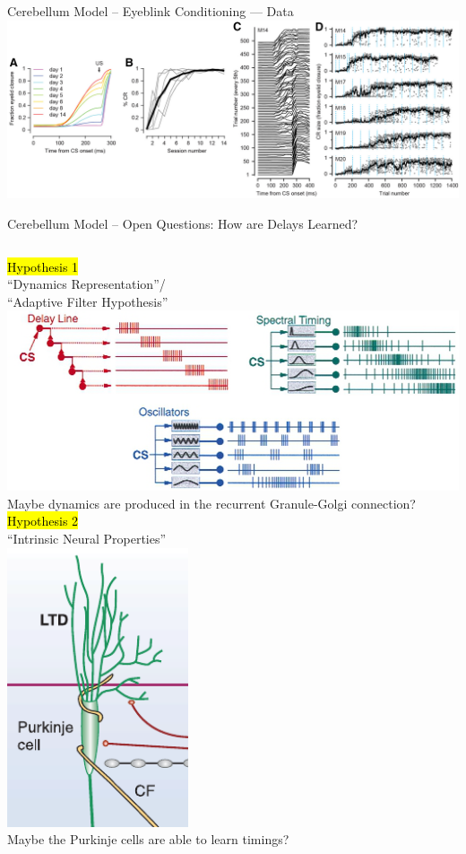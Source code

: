 \documentclass[handout,aspectratio=169]{beamer}
\begin{document}
	\begin{frame}{Cerebellum Model -- Eyeblink Conditioning --- Data}
		\centering\includegraphics[width=\textwidth]{media/heiney_et_al_avg_cr_over_time_2.png}
	\end{frame}
	
	\begin{frame}{Cerebellum Model -- Open Questions: How are Delays Learned?}
		\begin{columns}[t]
			\centering
			\hl{Hypothesis 1}\\[0.25cm]
			\enquote{Dynamics Representation}/\\\enquote{Adaptive Filter Hypothesis}\\[0.775cm]
			\includegraphics[width=\textwidth]{media/dynamics_rep.png}\\[0.775cm]
			Maybe dynamics are produced in the recurrent Granule-Golgi connection?
			\centering
			\hl{Hypothesis 2}\\[0.25cm]
			\enquote{Intrinsic Neural Properties}\\[0.25cm]
			\includegraphics[width=0.4\textwidth]{media/purkinje.pdf}\\[0.25cm]
			Maybe the Purkinje cells are able to learn timings?
		\end{columns}
	\end{frame}
	
\end{document}
